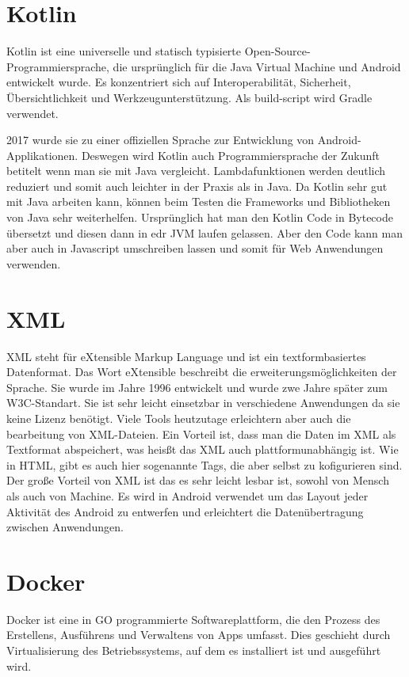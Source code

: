 \section{Kotlin}
\author{Bozidar Spasenovic}
Kotlin ist eine universelle und statisch typisierte Open-Source-Programmiersprache, die ursprünglich für die Java Virtual Machine und Android entwickelt wurde.
Es konzentriert sich auf Interoperabilität, Sicherheit, Übersichtlichkeit und Werkzeugunterstützung. Als build-script wird Gradle verwendet.

2017 wurde sie zu einer offiziellen Sprache zur Entwicklung von Android-Applikationen. Deswegen wird Kotlin auch Programmiersprache der Zukunft betitelt wenn man sie mit Java vergleicht.
Lambdafunktionen werden deutlich reduziert und somit auch leichter in der Praxis als in Java. 
Da Kotlin sehr gut mit Java arbeiten kann, können beim Testen die Frameworks und Bibliotheken von Java sehr weiterhelfen.  
Ursprünglich hat man den Kotlin Code in Bytecode übersetzt und diesen dann in edr JVM laufen gelassen. 
Aber den Code kann man aber auch in Javascript umschreiben lassen und somit für Web Anwendungen verwenden.

\section{XML}
\author{Bozidar Spasenovic}
XML steht für eXtensible Markup Language und ist ein textformbasiertes Datenformat.
Das Wort eXtensible beschreibt die erweiterungsmöglichkeiten der Sprache.
Sie wurde im Jahre 1996 entwickelt und wurde zwe Jahre später zum W3C-Standart. 
Sie ist sehr leicht einsetzbar in verschiedene Anwendungen da sie keine Lizenz benötigt.
Viele Tools heutzutage erleichtern aber auch die bearbeitung von XML-Dateien.
Ein Vorteil ist, dass man die Daten im XML als Textformat abspeichert, was heisßt das XML auch plattformunabhängig ist.
Wie in HTML, gibt es auch hier sogenannte Tags, die aber selbst zu kofigurieren sind. 
Der große Vorteil von XML ist das es sehr leicht lesbar ist, sowohl von Mensch als auch von Machine.
Es wird in Android verwendet um das Layout jeder Aktivität des Android zu entwerfen und erleichtert die Datenübertragung zwischen Anwendungen.




\section{Docker}
\author{Bozidar Spasenovic}
Docker ist eine in GO programmierte Softwareplattform, die den Prozess des Erstellens, Ausführens und Verwaltens von Apps umfasst.
Dies geschieht durch Virtualisierung des Betriebssystems, auf dem es installiert ist und ausgeführt wird. 

